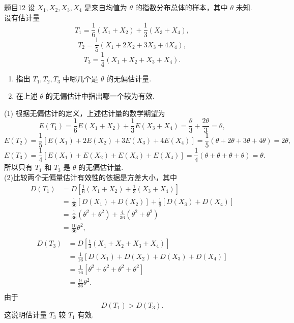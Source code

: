 \begin{question}{题目12}
    设 $X_1,X_2,X_3,X_4$ 是来自均值为 $\theta$ 的指数分布总体的样本，其中 $\theta$ 未知. 设有估计量
    $$
        T_1 = \frac{1}{6}(X_1 + X_2) + \frac{1}{3}(X_3 + X_4),
    $$
    $$
        T_2 = \frac{1}{5}(X_1 + 2X_2 + 3X_3 + 4X_4),
    $$
    $$
        T_3 = \frac{1}{4}(X_1 + X_2 + X_3 + X_4).
    $$
    \begin{enumerate}
        \item [(1)] 指出 $T_1, T_2, T_3$ 中哪几个是 $\theta$ 的无偏估计量.
        \item [(2)] 在上述 $\theta$ 的无偏估计中指出哪一个较为有效.
    \end{enumerate}
\end{question}
\begin{solution}
    (1) 根据无偏估计的定义，上述估计量的数学期望为
    $$
        E(T_1) = \frac{1}{6}E(X_1 + X_2) + \frac{1}{3}E(X_3 + X_4) = \frac{\theta}{3} + \frac{2\theta}{3} = \theta,
    $$
    $$
        E(T_2) = \frac{1}{5}[E(X_1) + 2E(X_2) + 3E(X_3) + 4E(X_4)]
        = \frac{1}{5}(\theta + 2\theta + 3\theta + 4\theta)
        = 2\theta,
    $$
    $$
        E(T_3) = \frac{1}{4}[E(X_1) + E(X_2) + E(X_3) + E(X_4)]
        = \frac{1}{4}(\theta+\theta+\theta+\theta)
        = \theta.
    $$
    所以只有 $T_1$ 和 $T_3$ 是 $\theta$ 的无偏估计量.\\
    (2)比较两个无偏量估计有效性的依据是方差大小，其中
    $$
        \begin{aligned}
            D(T_1)
             & = D\left[\frac{1}{6}(X_1+X_2) + \frac{1}{3}(X_3+X_4)\right]           \\
             & = \frac{1}{36}[D(X_1)+D(X_2)] + \frac{1}{9}[D(X_3) + D(X_4)]          \\
             & = \frac{1}{36}(\theta^2+\theta^2) + \frac{4}{36}(\theta^2 + \theta^2) \\
             & = \frac{10}{36}\theta^2,                                              \\
        \end{aligned}
    $$
    $$
        \begin{aligned}
            D(T_3)
             & = D\left[\frac{1}{4}(X_1+X_2+X_3+X_4)\right]              \\
             & = \frac{1}{16}[D(X_1) + D(X_2) + D(X_3) + D(X_4)]         \\
             & = \frac{1}{16}[\theta^2 + \theta^2 + \theta^2 + \theta^2] \\
             & = \frac{9}{36}\theta^2.                                   \\
        \end{aligned}
    $$
    由于
    $$
        D(T_1) > D(T_3).
    $$
    这说明估计量 $T_3$ 较 $T_1$ 有效.
\end{solution}
